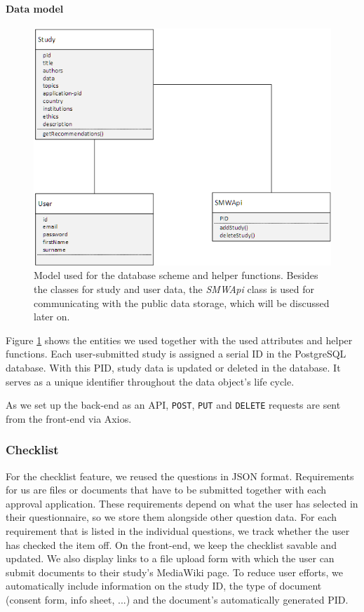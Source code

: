 \documentclass[10pt]{article}
\begin{document}
\paragraph*{Data model}

\begin{figure}
\includegraphics[width=1\textwidth]{img/classes.png}
\caption{Model used for the database scheme and helper functions. Besides the classes for study and user data, the \textit{SMWApi} class is used for communicating with the public data storage, which will be discussed later on.}
\label{fig:model}
\end{figure}

Figure \ref{fig:model} shows the entities we used together with the used attributes and helper functions. Each user-submitted study is assigned a serial ID in the PostgreSQL database. With this PID, study data is updated or deleted in the database. It serves as a unique identifier throughout the data object's life cycle. 

As we set up the back-end as an API, \texttt{POST}, \texttt{PUT} and \texttt{DELETE} requests are sent from the front-end via Axios. 

\subsubsection{Checklist}
For the checklist feature, we reused the questions in JSON format. Requirements for us are files or documents that have to be submitted together with each approval application. These requirements depend on what the user has selected in their questionnaire, so we store them alongside other question data. For each requirement that is listed in the individual questions, we track whether the user has checked the item off. On the front-end, we keep the checklist savable and updated. We also display links to a file upload form with which the user can submit documents to their study's MediaWiki page. To reduce user efforts, we automatically include information on the study ID, the type of document (consent form, info sheet, ...) and the document's automatically generated PID.
\end{document}
